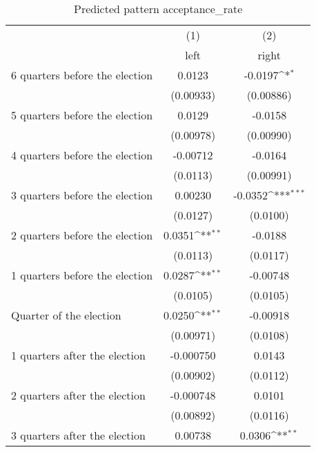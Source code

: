 \begin{table}[htbp]\centering
\def\sym#1{\ifmmode^{#1}\else\(^{#1}\)\fi}
\caption{Predicted pattern acceptance\_rate}
\begin{tabular}{l*{2}{c}}
\hline\hline
                    &\multicolumn{1}{c}{(1)}&\multicolumn{1}{c}{(2)}\\
                    &\multicolumn{1}{c}{left}&\multicolumn{1}{c}{right}\\
\hline
 6 quarters before the election&      0.0123         &     -0.0197\sym{*}  \\
                    &   (0.00933)         &   (0.00886)         \\
[1em]
 5 quarters before the election&      0.0129         &     -0.0158         \\
                    &   (0.00978)         &   (0.00990)         \\
[1em]
 4 quarters before the election&    -0.00712         &     -0.0164         \\
                    &    (0.0113)         &   (0.00991)         \\
[1em]
 3 quarters before the election&     0.00230         &     -0.0352\sym{***}\\
                    &    (0.0127)         &    (0.0100)         \\
[1em]
 2 quarters before the election&      0.0351\sym{**} &     -0.0188         \\
                    &    (0.0113)         &    (0.0117)         \\
[1em]
 1 quarters before the election&      0.0287\sym{**} &    -0.00748         \\
                    &    (0.0105)         &    (0.0105)         \\
[1em]
Quarter of the election&      0.0250\sym{**} &    -0.00918         \\
                    &   (0.00971)         &    (0.0108)         \\
[1em]
 1 quarters after the election&   -0.000750         &      0.0143         \\
                    &   (0.00902)         &    (0.0112)         \\
[1em]
 2 quarters after the election&   -0.000748         &      0.0101         \\
                    &   (0.00892)         &    (0.0116)         \\
[1em]
 3 quarters after the election&     0.00738         &      0.0306\sym{**} \\

\end{tabular}
\end{table}
